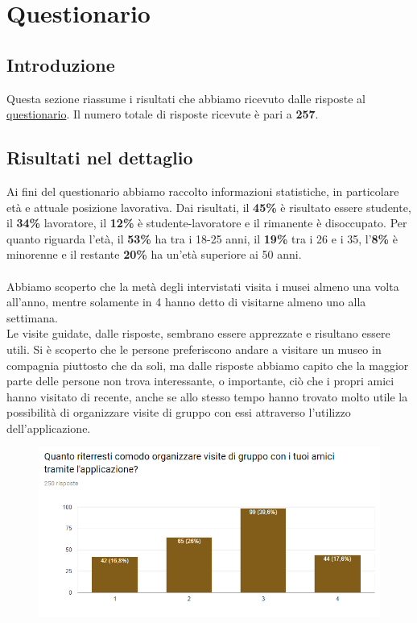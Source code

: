 \def\answers{257}

\section{Questionario}

\subsection{Introduzione}
Questa sezione riassume i risultati che abbiamo ricevuto dalle risposte al \href{https://docs.google.com/forms/d/1vKzFGCQb5nvyG6it8HfEqZgZ3ioQ6J1_T6eUiTdYIRc/edit}{questionario}. Il numero totale di risposte ricevute è pari a \textbf{\answers}.

\subsection{Risultati nel dettaglio}
Ai fini del questionario abbiamo raccolto informazioni statistiche, in particolare età e attuale posizione lavorativa. Dai risultati, il \textbf{45\%} è risultato essere studente, il \textbf{34\%} lavoratore, il \textbf{12\%} è studente-lavoratore e il rimanente è disoccupato. Per quanto riguarda l'età, il \textbf{53\%} ha tra i 18-25 anni, il \textbf{19\%} tra i 26 e i 35, l'\textbf{8\%} è minorenne e il restante \textbf{20\%} ha un'età superiore ai 50 anni.

\paragraph{}
Abbiamo scoperto che la metà degli intervistati visita i musei almeno una volta all'anno, mentre solamente in 4 hanno detto di visitarne almeno uno alla settimana.\\
Le visite guidate, dalle risposte, sembrano essere apprezzate e risultano essere utili. 
Si è scoperto che le persone preferiscono andare a visitare un museo in compagnia piuttosto che da soli, ma dalle risposte abbiamo capito che la maggior parte delle persone non trova interessante, o importante, ciò che i propri amici hanno visitato di recente, anche se allo stesso tempo hanno trovato molto utile la possibilità di organizzare visite di gruppo con essi attraverso l'utilizzo dell'applicazione.

\begin{figure}[ht]
    \centering
    \includegraphics[width=1.0\textwidth]{images/charts-questionario/chart-visite-gruppo.png}
\end{figure}

